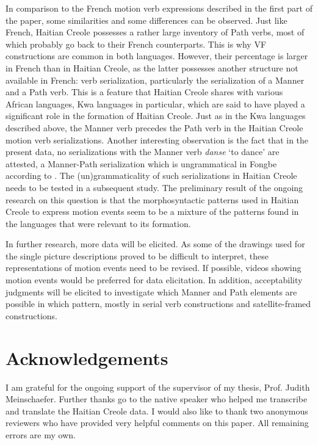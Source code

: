\documentclass[output=paper,colorlinks,citecolor=brown]{langscibook}
\begin{document}
In comparison to the French motion verb expressions described in the first part of the paper, some similarities and some differences can be observed. Just like French, Haitian Creole possesses a rather large inventory of Path verbs, most of which probably go back to their French counterparts. This is why VF constructions are common in both languages. However, their percentage is larger in French than in Haitian Creole, as the latter possesses another structure not available in French: verb serialization, particularly the serialization of a Manner and a Path verb. This is a feature that Haitian Creole shares with various African languages, Kwa languages in particular, which are said to have played a significant role in the formation of Haitian Creole. Just as in the Kwa languages described above, the Manner verb precedes the Path verb in the Haitian Creole motion verb serializations. Another interesting observation is the fact that in the present data, no serializations with the Manner verb \emph{danse} ‘to dance’ are attested, a Manner-Path serialization which is ungrammatical in Fongbe according to \citet{LambertBrtire_2009}. The (un)grammaticality of such serializations in Haitian Creole needs to be tested in a subsequent study. The preliminary result of the ongoing research on this question is that the morphosyntactic patterns used in Haitian Creole to express motion events seem to be a mixture of the patterns found in the languages that were relevant to its formation.

In further research, more data will be elicited. As some of the drawings used for the single picture descriptions proved to be difficult to interpret, these representations of motion events need to be revised. If possible, videos showing motion events would be preferred for data elicitation. In addition, acceptability judgments will be elicited to investigate which Manner and Path elements are possible in which pattern, mostly in serial verb constructions and satellite-framed constructions. 


\section*{Acknowledgements}
I am grateful for the ongoing support of the supervisor of my thesis, Prof. Judith Meinschaefer. Further thanks go to the native speaker who helped me transcribe and translate the Haitian Creole data. I would also like to thank two anonymous reviewers who have provided very helpful comments on this paper. All remaining errors are my own.

{\printbibliography[heading=subbibliography,notkeyword=this]}
\end{document}

